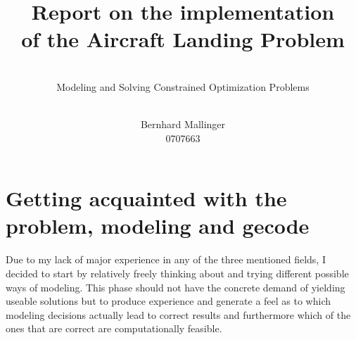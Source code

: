 \documentclass[,%
			paper=a4,%
			DIV12,
			liststotoc,
			bibtotoc,
			draft=false,%
			numbers=noendperiod
			]{scrartcl}
\title{Report on the implementation\\of the Aircraft Landing Problem}
\subtitle{\hfill \\ Modeling and Solving Constrained Optimization Problems}
\author{\hfill \\ Bernhard Mallinger \\ 0707663}
\begin{document}
\maketitle


\section{Getting acquainted with the problem, modeling and gecode}

Due to my lack of major experience in any of the three mentioned fields, I decided to start by relatively freely thinking about and trying different possible ways of modeling.
This phase should not have the concrete demand of yielding useable solutions but to produce experience and generate a feel as to which modeling decisions actually lead to correct results and furthermore which of the ones that are correct are computationally feasible.
\end{document}
